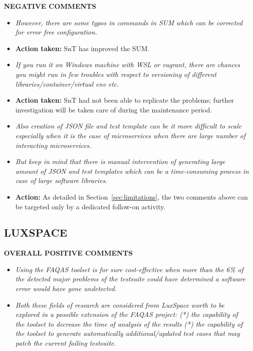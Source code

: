 \textbf{NEGATIVE  COMMENTS}
\begin{itemize}
\item \emph{However, there are some typos in commands in SUM which can be corrected for error free configuration.}

\item \textbf{Action taken:} SnT has improved the SUM.

\item \emph{If you run it on Windows machine with WSL or vagrant, there are chances you might run in few troubles with respect to versioning of different libraries/container/virtual env etc.}

\item \textbf{Action taken:} SnT had not been able to replicate the problems; further investigation will be taken care of during the maintenance period.

\item \emph{Also creation of JSON file and test template can be it more difficult to scale especially when it is the case of microservices when there are large number of interacting microservices.}

\item \emph{But keep in mind that there is manual intervention of generating large amount of JSON and test templates which can be a time-consuming process in case of large software libraries.}

\item \textbf{Action:} As detailed in Section~\ref{sec:limitations}, the two comments above can be targeted only by a dedicated follow-on activity.

\end{itemize}

\subsection{LUXSPACE}



\textbf{OVERALL POSITIVE COMMENTS}


\begin{itemize}
\item \emph{Using the FAQAS toolset is for sure cost-effective when more than the 6\% of the detected major problems of the testsuite could have determined a software error would have gone undetected. }

\item \emph{Both these fields of research are considered from LuxSpace worth to be explored in a possible extension of the FAQAS project:
(*) the capability of the toolset to decrease the time of analysis of the results (*) the capability of the toolset to generate automatically additional/updated test cases that may patch the current failing testsuite.}
\end{itemize}

